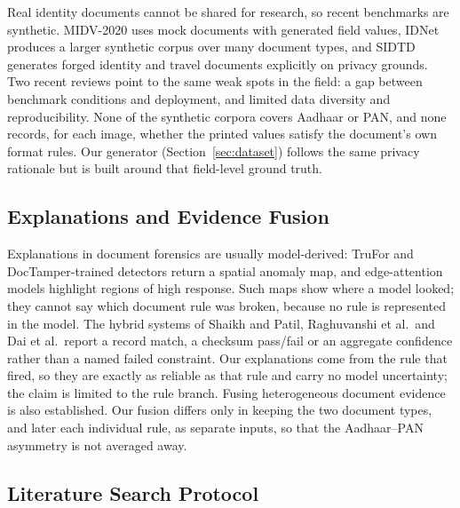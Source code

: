 \documentclass[VANCOUVER,Times1COL]{WileyNJDv5}
\begin{document}
Real identity documents cannot be shared for research, so recent
benchmarks are synthetic. MIDV-2020\cite{midv} uses mock documents with
generated field values, IDNet\cite{idnet} produces a larger synthetic
corpus over many document types, and SIDTD\cite{sidtd} generates
forged identity and travel documents explicitly on privacy grounds.
Two recent reviews point to the same weak spots in the field: a gap
between benchmark conditions and deployment\cite{survey}, and limited
data diversity and reproducibility\cite{zhang}. None of the synthetic
corpora covers Aadhaar or PAN, and none records, for each image,
whether the printed values satisfy the document's own format rules. Our
generator (Section~\ref{sec:dataset}) follows the same privacy
rationale but is built around that field-level ground truth.

\subsection{Explanations and Evidence Fusion}

Explanations in document forensics are usually model-derived: TruFor and
DocTamper-trained detectors return a spatial anomaly map, and
edge-attention models highlight regions of high response. Such maps
show where a model looked; they cannot say which document rule was
broken, because no rule is represented in the model. The hybrid systems
of Shaikh and Patil, Raghuvanshi et al.\ and Dai et al.\ report a
record match, a checksum pass/fail or an aggregate confidence rather
than a named failed constraint. Our explanations come from the rule that
fired, so they are exactly as reliable as that rule and carry no model
uncertainty; the claim is limited to the rule branch. Fusing
heterogeneous document evidence is also established\cite{dai}. Our
fusion differs only in keeping the two document types, and later each
individual rule, as separate inputs, so that the Aadhaar--PAN asymmetry
is not averaged away.

\subsection{Literature Search Protocol}
\label{sec:search-protocol}
\end{document}

